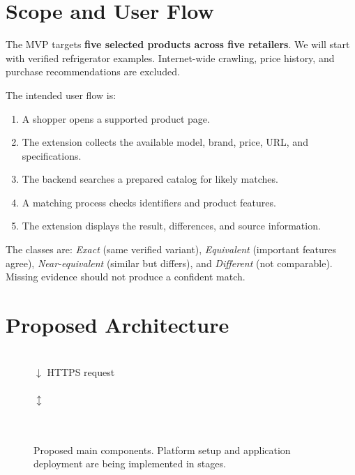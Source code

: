 \documentclass[conference,10pt]{IEEEtran}
\begin{document}
\section{Scope and User Flow}
The MVP targets \textbf{five selected products across five retailers}. We will start with verified refrigerator examples. Internet-wide crawling, price history, and purchase recommendations are excluded.

The intended user flow is:
\begin{enumerate}
\item A shopper opens a supported product page.
\item The extension collects the available model, brand, price, URL, and specifications.
\item The backend searches a prepared catalog for likely matches.
\item A matching process checks identifiers and product features.
\item The extension displays the result, differences, and source information.
\end{enumerate}

The classes are: \emph{Exact} (same verified variant), \emph{Equivalent} (important features agree), \emph{Near-equivalent} (similar but differs), and \emph{Different} (not comparable). Missing evidence should not produce a confident match.

\section{Proposed Architecture}
\begin{figure}[t]
\centering
\setlength{\fboxsep}{4pt}
\\[2pt]
$\downarrow$ HTTPS request\\[1pt]
\\[2pt]
$\updownarrow$\\[1pt]
\\[5pt]
\\[5pt]
\caption{Proposed main components. Platform setup and application deployment are being implemented in stages.}
\label{fig:design}
\end{figure}
\end{document}
